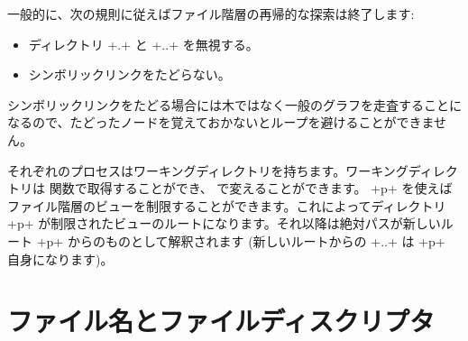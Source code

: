 一般的に、次の規則に従えばファイル階層の再帰的な探索は終了します:
%
\begin{itemize}
\item ディレクトリ \ml+.+ と \ml+..+ を無視する。
\item シンボリックリンクをたどらない。
\end{itemize}
%
シンボリックリンクをたどる場合には木ではなく一般のグラフを走査することになるので、たどったノードを覚えておかないとループを避けることができません。

それぞれのプロセスはワーキングディレクトリを持ちます。ワーキングディレクトリは  関数で取得することができ、 で変えることができます。 \ml+p+ を使えばファイル階層のビューを制限することができます。これによってディレクトリ \ml+p+ が制限されたビューのルートになります。それ以降は絶対パスが新しいルート \ml+p+ からのものとして解釈されます (新しいルートからの \ml+..+ は \ml+p+ 自身になります)。

\section{ファイル名とファイルディスクリプタ}


